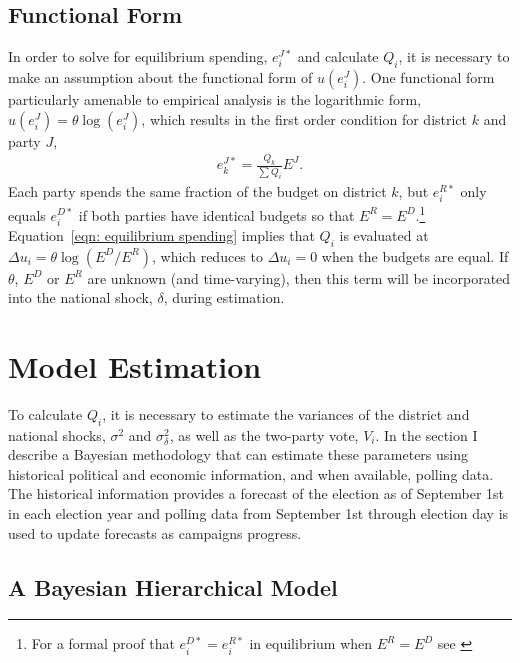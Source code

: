 \documentclass[12pt,final,fleqn]{article}
\theoremstyle{plain}
\begin{document}
\subsection{Functional Form} \label{sec: functional form}
In order to solve for equilibrium spending, $e_i^{J*}$ and calculate $Q_i$, it is necessary to make an assumption about the functional form of $u(e_i^J)$. One functional form particularly amenable to empirical analysis is the logarithmic form, $u(e_i^J)= \theta \log (e_i^J)$, which results in the first order condition for district $k$ and party $J$,
\begin{align} \label{eqn: equilibrium spending}
e_k^{J*} = \frac{Q_k}{\sum Q_i}E^{J}.
\end{align} 
Each party spends the same fraction of the budget on district $k$, but $e_i^{R*}$ only equals $e_i^{D*}$ if both parties have identical budgets so that $E^{R} = E^{D}$.\footnote{For a formal proof that $e_i^{D*} = e_i^{R*}$ in equilibrium when $E^R = E^D$ see \citet{stromberg2008electoral}} Equation~\ref{eqn: equilibrium spending} implies that $Q_i$ is evaluated at $\Delta u_i = \theta \log(E^D/E^R)$, which reduces to $\Delta u_i=0$ when the budgets are equal. If $\theta$, $E^D$ or $E^R$ are unknown (and time-varying), then this term will be incorporated into the national shock, $\delta$, during estimation.

\section{Model Estimation}
To calculate $Q_i$, it is necessary to estimate the variances of the district and national shocks, $\sigma^2$ and $\sigma^2_\delta$, as well as the two-party vote, $V_i$. In the section I describe a Bayesian methodology that can estimate these parameters using historical political and economic information, and when available, polling data. The historical information provides a forecast of the election as of September 1st in each election year and polling data from September 1st through election day is used to update forecasts as campaigns progress. 

\subsection{A Bayesian Hierarchical Model}
\end{document}

